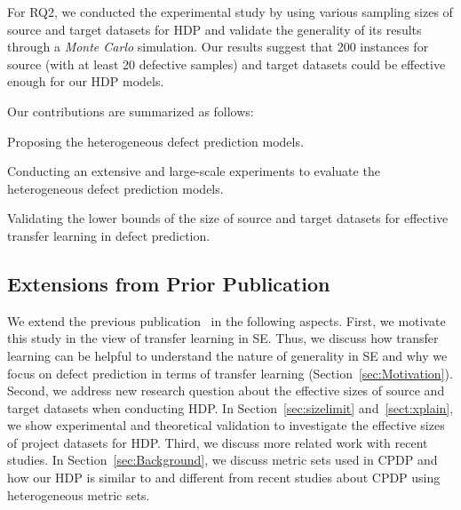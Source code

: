 For RQ2, we conducted the experimental study by using various sampling sizes of source and target datasets for HDP and validate the generality of its results through a {\em Monte Carlo} simulation. Our results suggest that 200 instances for source (with at least 20 defective samples) and target datasets could be effective enough for our HDP models.



Our contributions are summarized as follows:
\squishlist
  \item Proposing the heterogeneous defect prediction models.
  \item Conducting an extensive and large-scale experiments to evaluate
  the heterogeneous defect prediction models.
  \item Validating the lower bounds of the size of source and target datasets for effective transfer learning in defect prediction.
\squishend


\subsection{Extensions from Prior Publication}

We extend the previous publication~\cite{Nam15HDP} in the following aspects. First, we motivate this study in the view of transfer learning in SE. Thus, we discuss how transfer learning can be helpful to understand the nature of generality in SE and why we focus on defect prediction in terms of transfer learning (Section~\ref{sec:Motivation}). Second, we address new research question about the effective sizes of source and target datasets when conducting HDP.  In Section~\ref{sec:sizelimit} and~\ref{sect:xplain}, we show experimental and theoretical validation to investigate the effective sizes of project datasets for HDP. Third, we discuss more related work with recent studies. In Section~\ref{sec:Background}, we discuss metric sets used in CPDP and how our HDP is similar to and different from recent studies about CPDP using heterogeneous metric sets.




